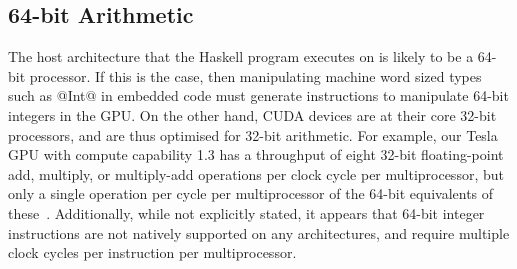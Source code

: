 %


\subsection{64-bit Arithmetic}

The host architecture that the Haskell program executes on is likely to be a
64-bit processor. If this is the case, then manipulating machine word sized
types such as @Int@ in embedded code must generate instructions to manipulate
64-bit integers in the GPU\@. On the other hand, CUDA devices are at their core
32-bit processors, and are thus optimised for 32-bit arithmetic. For example, our
Tesla GPU with compute capability 1.3 has a throughput of eight 32-bit
floating-point add, multiply, or multiply-add operations per clock cycle per
multiprocessor, but only a single operation per cycle per multiprocessor of the
64-bit equivalents of these~\cite{NVIDIA:2012wf}. %
Additionally, while not explicitly stated, it appears that 64-bit integer
instructions are not natively supported on any architectures, and require
multiple clock cycles per instruction per multiprocessor.

